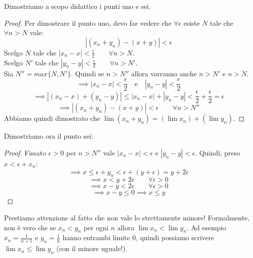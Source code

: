 Dimostriamo a scopo didattico i punti uno e sei.
\begin{proof}
Per dimostrare il punto uno, devo far vedere che $\forall \epsilon$ esiste $N$ tale che $\forall n > N$ vale:
\begin{equation*}
|(x_n + y_n) - (x+y)| < \epsilon
\end{equation*}
Scelgo $N$ tale che $|x_n-x| < \frac{\epsilon}{2} \qquad \forall n > N$. \\
Scelgo $N'$ tale che $|y_n-y| < \frac{\epsilon}{2} \qquad \forall n > N'$. \\
Sia $N'' = max\{N, N'\}$.
Quindi se $n > N''$ allora varranno anche $n > N'$ e $n > N$.
\begin{equation*}
\implies |x_n - x| < \frac{\epsilon}{2} \quad \text{e} \quad |y_n - y| < \frac{\epsilon}{2}
\end{equation*}
\begin{equation*}
\implies |(x_n-x)+(y_n-y)| \le |x_n-x|+|y_n-y| < \frac{\epsilon}{2} + \frac{\epsilon}{2} = \epsilon
\end{equation*}
\begin{equation*}
\implies |(x_n+y_n) - (x+y)| < \epsilon \qquad \forall n > N''
\end{equation*}
Abbiamo quindi dimostrato che $\lim(x_n+y_n) = (\lim x_n) + (\lim y_n)$.
\end{proof}

Dimostriamo ora il punto sei:
\begin{proof}
Fissato $\epsilon > 0$ per $n > N''$ vale $|x_n-x| < \epsilon$ e $|y_n-y| < \epsilon$.
Quindi, preso $x < \epsilon + x_n$:
\begin{equation*}
\implies x \le \epsilon + y_n < \epsilon + (y + \epsilon) = y + 2\epsilon
\end{equation*}
\begin{equation*}
\implies x < y + 2\epsilon \qquad \forall \epsilon > 0
\end{equation*}
\begin{equation*}
\implies x - y < 2\epsilon \qquad \forall \epsilon > 0
\end{equation*}
\begin{equation*}
\implies x - y \le 0 \implies x \le y
\end{equation*}
\end{proof}

Prestiamo attenzione al fatto che non vale lo strettamente minore! Formalmente, non è vero che se $x_n < y_n$ per ogni $n$ allora $\lim x_n < \lim y_n$. Ad esempio $x_n = \frac{1}{n + 1}$ e $y_n = \frac{1}{n}$ hanno entrambi limite $0$, quindi possiamo scrivere $\lim x_n \le \lim y_n$ (con il minore uguale!).


